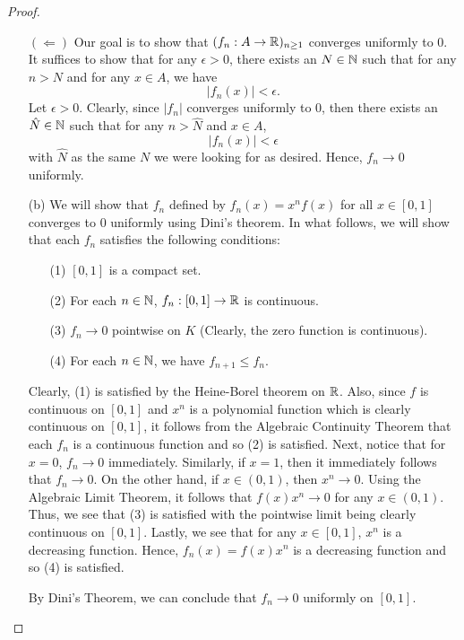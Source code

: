 \documentclass[a4paper]{article}
\begin{document}
\begin{proof}
\begin{enumerate}
       \( (\Longleftarrow) \) Our goal is to show that \( ({f}_{n}: A \to \mathbb{R} )_{n \geq 1} \) converges uniformly to \( 0  \). It suffices to show that for any \( \epsilon > 0  \), there exists an \( N \in \mathbb{N} \) such that for any \( n > N  \) and for any \( x \in A  \), we have   
       \[  | {f}_{n}(x) | < \epsilon. \]
       Let \( \epsilon > 0  \). Clearly, since \( | {f}_{n} |  \) converges uniformly to \( 0  \), then there exists an \( \hat{N} \in \mathbb{N} \) such that for any \( n > \hat{N} \) and \( x \in A  \), 
       \[  | {f}_{n}(x) | < \epsilon \]
       with \( \hat{N} \) as the same \( N  \) we were looking for as desired. Hence, \( {f}_{n} \to 0  \) uniformly.
   \item[(b)] We will show that \( {f}_{n}  \) defined by \( {f}_{n}(x) = x^{n} f(x) \) for all \( x \in [0,1] \) converges to \( 0  \) uniformly using Dini's theorem. In what follows, we will show that each \( {f}_{n} \) satisfies the following conditions:
       \begin{enumerate}
           \item[(1)] \( [0,1] \) is a compact set.
           \item[(2)] For each \( n \in \mathbb{N} \), \( {f}_{n} : [0,1] \to \mathbb{R}  \) is continuous.
            \item[(3)] \( {f}_{n} \to 0  \) pointwise on \( K  \) (Clearly, the zero function is continuous). 
            \item[(4)] For each \( n \in \mathbb{N} \), we have \( {f}_{n+1} \leq {f}_{n} \).
       \end{enumerate}
       Clearly, (1) is satisfied by the Heine-Borel theorem on \( \mathbb{R}  \). Also, since \( f  \) is continuous on \( [0,1] \) and \( x^{n} \) is a polynomial function which is clearly continuous on \( [0,1] \), it follows from the Algebraic Continuity Theorem that each \( {f}_{n} \) is a continuous function and so (2) is satisfied. Next, notice that for \( x = 0  \), \( {f}_{n} \to 0  \) immediately. Similarly, if \( x = 1  \), then it immediately follows that \( {f}_{n} \to 0  \). On the other hand, if \( x \in (0,1) \), then \( x^{n} \to 0  \). Using the Algebraic Limit Theorem, it follows that \( f(x) x^{n} \to 0  \) for any \( x \in (0,1) \). Thus, we see that (3) is satisfied with the pointwise limit being clearly continuous on \( [0,1] \). Lastly, we see that for any \( x \in [0,1] \), \( x^{n} \) is a decreasing function. Hence, \( {f}_{n}(x) =  f(x) x^{n} \) is a decreasing function and so (4) is satisfied.

       By Dini's Theorem, we can conclude that \( {f}_{n} \to 0  \) uniformly on \( [0,1] \).
\end{enumerate} 
\end{proof}
\end{document}
